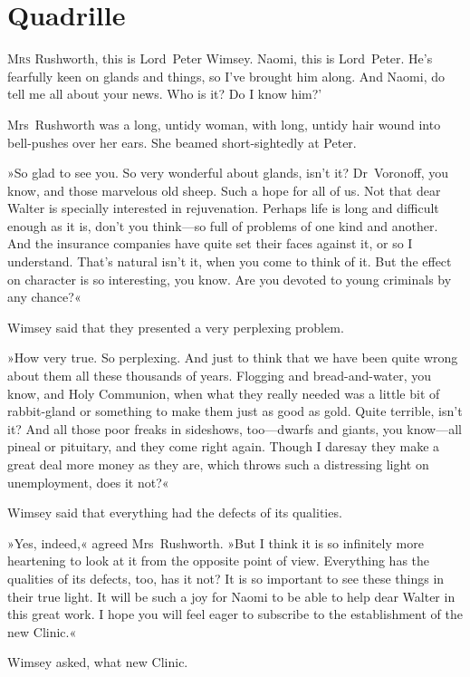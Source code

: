 \chapter{Quadrille}

\lettrine[lines=4,ante=‘]{M}{rs} Rushworth, this is Lord~Peter Wimsey. Naomi, this is Lord~Peter. He's fearfully keen on glands and things, so I've brought him along. And Naomi, do tell me all about your news. Who is it? Do I know him?'

Mrs~Rushworth was a long, untidy woman, with long, untidy hair wound into bell-pushes over her ears. She beamed short-sightedly at Peter.

»So glad to see you. So very wonderful about glands, isn't it? Dr~Voronoff, you know, and those marvelous old sheep. Such a hope for all of us. Not that dear Walter is specially interested in rejuvenation. Perhaps life is long and difficult enough as it is, don't you think—so full of problems of one kind and another. And the insurance companies have quite set their faces against it, or so I understand. That's natural isn't it, when you come to think of it. But the effect on character is so interesting, you know. Are you devoted to young criminals by any chance?«

Wimsey said that they presented a very perplexing problem.

»How very true. So perplexing. And just to think that we have been quite wrong about them all these thousands of years. Flogging and bread-and-water, you know, and Holy Communion, when what they really needed was a little bit of rabbit-gland or something to make them just as good as gold. Quite terrible, isn't it? And all those poor freaks in sideshows, too—dwarfs and giants, you know—all pineal or pituitary, and they come right again. Though I daresay they make a great deal more money as they are, which throws such a distressing light on unemployment, does it not?«

Wimsey said that everything had the defects of its qualities.

»Yes, indeed,« agreed Mrs~Rushworth. »But I think it is so infinitely more heartening to look at it from the opposite point of view. Everything has the qualities of its defects, too, has it not? It is so important to see these things in their true light. It will be such a joy for Naomi to be able to help dear Walter in this great work. I hope you will feel eager to subscribe to the establishment of the new Clinic.«

Wimsey asked, what new Clinic.

